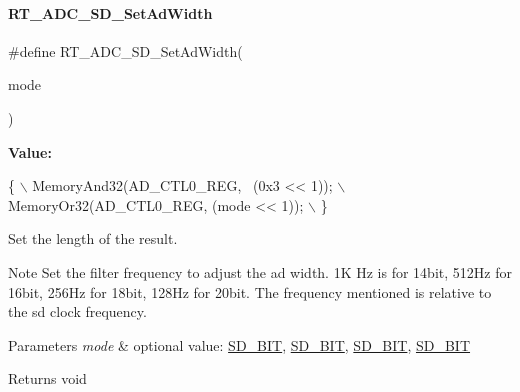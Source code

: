 \paragraph{\texorpdfstring{R\+T\+\_\+\+A\+D\+C\+\_\+\+S\+D\+\_\+\+Set\+Ad\+Width}{RT\_ADC\_SD\_SetAdWidth}}
{\footnotesize\ttfamily \#define R\+T\+\_\+\+A\+D\+C\+\_\+\+S\+D\+\_\+\+Set\+Ad\+Width(\begin{DoxyParamCaption}\item[{}]{mode }\end{DoxyParamCaption})}

{\bfseries Value\+:}
\begin{DoxyCode}
\{                                          \(\backslash\)
        MemoryAnd32(AD\_CTL0\_REG, ~(0x3 << 1)); \(\backslash\)
        MemoryOr32(AD\_CTL0\_REG, (mode << 1));  \(\backslash\)
    \}
\end{DoxyCode}


Set the length of the result. 

\begin{DoxyNote}{Note}
Set the filter frequency to adjust the ad width. 1K Hz is for 14bit, 512\+Hz for 16bit, 256\+Hz for 18bit, 128\+Hz for 20bit. The frequency mentioned is relative to the sd clock frequency. 
\end{DoxyNote}

\begin{DoxyParams}{Parameters}
{\em mode} & optional value\+: \mbox{\hyperlink{a00002_a44030e617a742aba101c6dcd3ec2078ea9c86002a4a99d0d440bca9b7f8d2ec93}{S\+D\+\_\+B\+IT}}, \mbox{\hyperlink{a00002_a44030e617a742aba101c6dcd3ec2078ea43562124882d2ecf1ce1b062c46e035c}{S\+D\+\_\+B\+IT}}, \mbox{\hyperlink{a00002_a44030e617a742aba101c6dcd3ec2078eacac5c6814a8f28e35ebeef99751a9d5f}{S\+D\+\_\+B\+IT}}, \mbox{\hyperlink{a00002_a44030e617a742aba101c6dcd3ec2078ea3a9f3242e2567dcfb29f566e45cf6de0}{S\+D\+\_\+B\+IT}} \\
\hline
\end{DoxyParams}
\begin{DoxyReturn}{Returns}
void 
\end{DoxyReturn}
\mbox{\label{a00002_a246ce987fa2b9f254f4796340eb23ed0}} 
